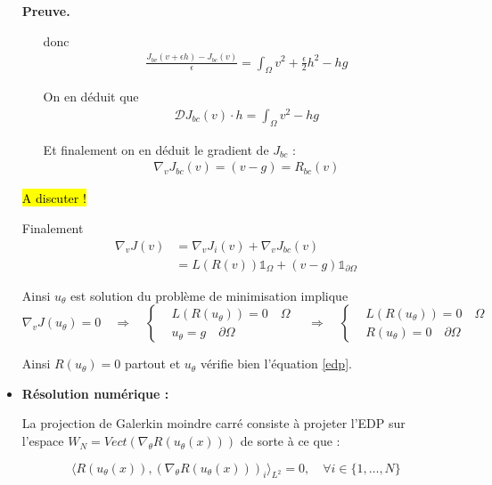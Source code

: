 \documentclass[french]{article}
\newenvironment{preuve}[1][]{\begin{tcolorbox}[
	colback=white, %
	colframe=green!70!black, %
	arc=2mm, %
	boxrule=1pt, %
	breakable, enhanced jigsaw
	]
	\textcolor{green!70!black}{\textbf{Preuve.} \\}

	#1
}{\end{tcolorbox}}
\begin{document}
\begin{itemize}[label=]
\begin{preuve}
\begin{itemize}[label=\textbullet]
				donc
				\begin{align*}
					\frac{J_{bv}(v+\epsilon h)-J_{bc}(v)}{\epsilon} = \int_{\Omega} v^2+\frac{\epsilon}{2} h^2 - hg
				\end{align*}
				
				On en déduit que
				\begin{align*}
					\mathcal{D}J_{bc}(v)\cdot h = \int_{\Omega} v^2 - hg
				\end{align*}
				
				Et finalement on en déduit le gradient de $J_{bc}$ :
				\begin{align*}
					\nabla_v J_{bc}(v) = (v-g) = R_{bc}(v) 
				\end{align*}
			\end{itemize}
		
			\hl{A discuter !}
		
			Finalement
			\begin{align*}
			\nabla_v J(v) &= \nabla_v  J_{i}(v) + \nabla_v J_{bc}(v) \\
			&= L(R(v))\mathbb{1}_\Omega + (v-g)\mathbb{1}_{\partial\Omega}
			\end{align*}
			
			Ainsi $u_\theta$ est solution du problème de minimisation implique
			\begin{equation*}
			\nabla_v J(u_\theta)=0 \quad \Rightarrow \quad \left\{\begin{aligned}
				&L(R(u_\theta))=0 \quad \Omega \\
				&u_\theta=g \quad \partial\Omega
			\end{aligned}\right. \quad \Rightarrow \quad \left\{\begin{aligned}
				&L(R(u_\theta))=0 \quad \Omega \\
				&R(u_\theta)=0 \quad \partial\Omega
			\end{aligned}\right.
			\end{equation*}
		
			Ainsi $R(u_\theta)=0$ partout et $u_\theta$ vérifie bien l'équation \eqref{edp}.
		\end{preuve}

		\item \textbf{Résolution numérique :}
		
		La projection de Galerkin moindre carré consiste à projeter l'EDP sur l'espace $W_N=Vect(\nabla_\theta R(u_\theta(x)))$ de sorte à ce que :
		
		\begin{equation*}
			\langle R(u_\theta(x)), (\nabla_\theta R(u_\theta(x)))_i\rangle_{L^2} = 0, \quad \forall i \in \{1,\dots,N\}
		\end{equation*}
		

\end{itemize}
\end{document}
